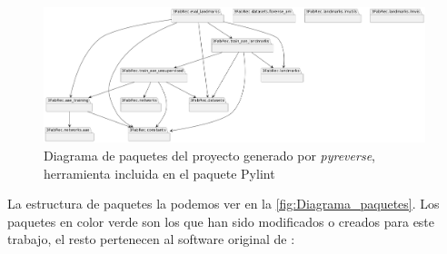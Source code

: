 \begin{figure}[!h]
    \centering
    \includegraphics[width=0.99\textwidth]{img/diagrama_paquetes_1.png}
    \caption{Diagrama de paquetes del proyecto generado por \textit{pyreverse}, herramienta incluida en el paquete Pylint}
    \label{fig:Diagrama_paquetes}
\end{figure}

\medskip

\noindent La estructura de paquetes la podemos ver en la \autoref{fig:Diagrama_paquetes}. Los paquetes en color verde son los que han sido modificados o creados para este trabajo, el resto pertenecen al software original de \cite{browatzki20203fabrec}:

